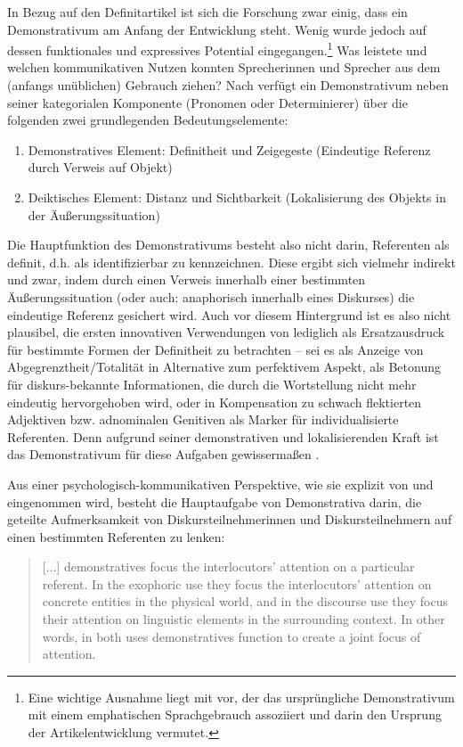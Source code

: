 In Bezug auf den Definitartikel ist sich die Forschung zwar einig, dass ein Demonstrativum am Anfang der Entwicklung steht. Wenig wurde jedoch auf dessen funktionales und expressives Potential eingegangen.\footnote{Eine wichtige Ausnahme liegt mit \textcite[16f.]{Hodler1954} vor, der das ursprüngliche Demonstrativum mit einem emphatischen Sprachgebrauch assoziiert und darin den Ursprung der Artikelentwicklung vermutet.} Was leistete  und welchen kommunikativen Nutzen konnten Sprecherinnen und Sprecher aus dem (anfangs unüblichen) Gebrauch ziehen? Nach \textcite[40]{Lehmann2015} verfügt ein Demonstrativum neben seiner kategorialen Komponente (Pronomen oder Determinierer) über die folgenden zwei grundlegenden Bedeutungselemente:

\begin{enumerate}
\item Demonstratives Element: Definitheit und Zeigegeste (Eindeutige Referenz durch  Verweis auf Objekt)  
\item Deiktisches Element:  Distanz und Sichtbarkeit (Lokalisierung des Objekts in der Äußerungssituation)
\end{enumerate}
\noindent
Die Hauptfunktion des Demonstrativums besteht also  nicht darin, Referenten als definit, d.h. als identifizierbar zu kennzeichnen. Diese ergibt sich vielmehr indirekt und zwar, indem durch einen Verweis innerhalb einer bestimmten Äußerungssituation (oder auch: anaphorisch innerhalb eines Diskurses) die eindeutige Referenz gesichert wird. Auch vor diesem Hintergrund ist es also nicht plausibel, die ersten innovativen Verwendungen von  lediglich als Ersatzausdruck für bestimmte Formen der Definitheit zu betrachten -- sei es als Anzeige von Abgegrenztheit/Totalität in Alternative zum perfektivem Aspekt, als Betonung für diskurs-bekannte Informationen, die durch die Wortstellung nicht mehr eindeutig hervorgehoben wird, oder in Kompensation zu schwach flektierten Adjektiven bzw. adnominalen Genitiven als Marker für individualisierte Referenten. Denn aufgrund seiner demonstrativen und lokalisierenden Kraft ist das Demonstrativum für diese Aufgaben gewissermaßen . 

Aus einer psychologisch-kommunikativen Perspektive, wie sie explizit von \textcite{Epstein1993,Epstein1994} und \textcite{Diessel2006} eingenommen wird, besteht die Hauptaufgabe von Demonstrativa  darin, die geteilte Aufmerksamkeit von Diskursteilnehmerinnen und Diskursteilnehmern auf einen bestimmten Referenten zu lenken: \blockcquote[476]{Diessel2006}{[...] demonstratives
focus the interlocutors’ attention on a particular referent. In the
exophoric use they focus the interlocutors’ attention on concrete entities
in the physical world, and in the discourse use they focus their attention
on linguistic elements in the surrounding context. In other words, in both
uses demonstratives function to create a joint focus of attention.}

